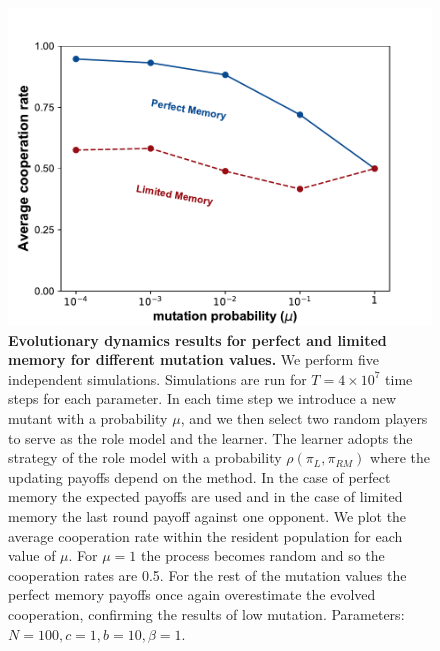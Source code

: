 \documentclass[11pt]{article}
\theoremstyle{plainCl1}
\theoremstyle{plainCl2}
\begin{document}
\begin{figure}[!htbp]
  \centering 
  \includegraphics[width=.5\textwidth]{static/mutation_perfect_and_limited_memory_donation_game.pdf}
  \caption{\textbf{Evolutionary dynamics results for perfect and limited memory
  for different mutation values.}
  We perform five independent simulations. Simulations are run
  for $T\!=\!4\times 10^7$ time steps for each parameter. In each time step
  we introduce a new mutant with a probability \(\mu\), and we then select
  two random players to serve as the role model and the learner. The learner
  adopts the strategy of the role model with a probability \(\rho(\pi_{L}, \pi_{RM})\) where the
  updating payoffs depend on the method. In the case of perfect memory
  the expected payoffs are used and in the case of limited memory the
  last round payoff against one opponent. We plot the average cooperation rate
  within the resident population for each value of \(\mu\). For \(\mu=1\)
  the process becomes random and so the cooperation rates are 0.5. For the rest
  of the mutation values the perfect memory payoffs once again overestimate the
  evolved cooperation, confirming the results of low mutation. Parameters: \(N
  =100, c=1, b=10, \beta=1\).}\label{fig:mutation}
\end{figure}



\end{document}

